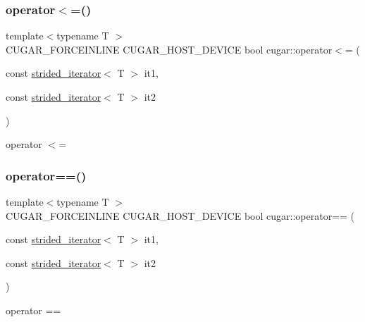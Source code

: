 \subsubsection{\texorpdfstring{operator$<$=()}{operator<=()}}
{\footnotesize\ttfamily template$<$typename T $>$ \\
C\+U\+G\+A\+R\+\_\+\+F\+O\+R\+C\+E\+I\+N\+L\+I\+NE C\+U\+G\+A\+R\+\_\+\+H\+O\+S\+T\+\_\+\+D\+E\+V\+I\+CE bool cugar\+::operator$<$= (\begin{DoxyParamCaption}\item[{const \hyperlink{structcugar_1_1strided__iterator}{strided\+\_\+iterator}$<$ T $>$}]{it1,  }\item[{const \hyperlink{structcugar_1_1strided__iterator}{strided\+\_\+iterator}$<$ T $>$}]{it2 }\end{DoxyParamCaption})}

operator $<$= \mbox{\label{group___iterators_ga72e24473e98fc1cd1bd45b9e55e154ec}} 
\subsubsection{\texorpdfstring{operator==()}{operator==()}\hspace{0.1cm}{\footnotesize\ttfamily [1/2]}}
{\footnotesize\ttfamily template$<$typename T $>$ \\
C\+U\+G\+A\+R\+\_\+\+F\+O\+R\+C\+E\+I\+N\+L\+I\+NE C\+U\+G\+A\+R\+\_\+\+H\+O\+S\+T\+\_\+\+D\+E\+V\+I\+CE bool cugar\+::operator== (\begin{DoxyParamCaption}\item[{const \hyperlink{structcugar_1_1strided__iterator}{strided\+\_\+iterator}$<$ T $>$}]{it1,  }\item[{const \hyperlink{structcugar_1_1strided__iterator}{strided\+\_\+iterator}$<$ T $>$}]{it2 }\end{DoxyParamCaption})}

operator == \mbox{\label{group___iterators_ga465edad50b0d8fadcb83a0eb90255327}} 
